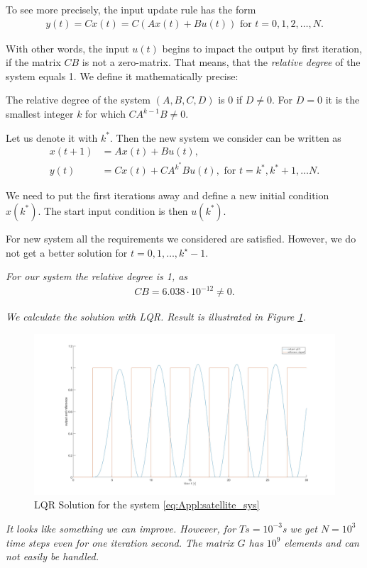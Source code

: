 To see more precisely, the input update rule has the form 
\begin{align}
y(t) = C x(t) = C(A x(t) + B u(t)) \text{ for } t = 0, 1,2, \dots, N. 
\end{align}

With other words, the input $u(t)$ begins to impact the output by first iteration, if the matrix $CB$ is not a zero-matrix. That means, that the \textit{relative degree} of the system equals 1. We define it mathematically precise: 
\begin{defi}
	The relative degree of the system $(A, B, C, D)$ is 0 if $D \neq 0$. For $D = 0$ it is the smallest integer $k$ for which $	C A^{k-1} B \neq 0$.
\end{defi} 
Let us denote it with $k^*$. Then the new system we consider can be written as 
\begin{align}
x(t+1) &= A x(t) + B u(t), \\
y(t) &= C x(t) + C A^{k^*} B u(t),  \text{ for } t = k^*, k^* + 1, \dots N. 
\end{align}

We need to put the first iterations away and define a new initial condition $x(k^*)$. The start input condition is then $u(k^*)$. 

For new system all the requirements we considered are satisfied. However, we do not get a better solution for $t = 0, 1, \dots, k^\star - 1$. 


\begin{example}[continued]
	
\textit{For our system the relative degree is 1, as }
	\begin{align}
	CB = 6.038\cdot 10^{-12} \neq 0. 
	\end{align}
	
\textit{We calculate the solution with LQR. Result is illustrated in Figure \ref{img:Appl:Sat_LQR}.}
	
	\begin{figure}[ht]
		\centering
		\includegraphics[width=\textwidth]{fig/Ex3_LQR.jpg}
		\caption{LQR Solution for the system \eqref{eq:Appl:satellite_sys}}
		\label{img:Appl:Sat_LQR}
	\end{figure}
	
\textit{It looks like something we can improve. However, for $Ts = 10^{-3}$s we get $N = 10^3$ time steps even for one iteration second. The matrix $G$ has  $10^9$ elements and can not easily be handled.}
\end{example}

